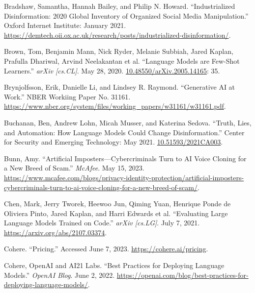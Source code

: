 \documentclass{article}
\begin{document}
\begin{thebibliography}{9}
  Bradshaw, Samantha, Hannah Bailey, and Philip N. Howard. ``Industrialized Disinformation: 2020 Global Inventory of Organized Social Media Manipulation.'' Oxford Internet Institute: January 2021. \href{https://demtech.oii.ox.ac.uk/research/posts/industrialized-disinformation/}{https://demtech.oii.ox.ac.uk/research/posts/industrialized-disinformation/}. 

  Brown, Tom, Benjamin Mann, Nick Ryder, Melanie Subbiah, Jared Kaplan, Prafulla Dhariwal, Arvind Neelakantan et al. ``Language Models are Few-Shot Learners.'' \textit{arXiv [cs.CL]}. May 28, 2020. \href{https://arxiv.org/abs/2005.14165}{10.48550/arXiv.2005.14165}: 35.

  Brynjolfsson, Erik, Danielle Li, and Lindsey R. Raymond. ``Generative AI at Work.'' NBER Workiing Paper No. 31161. \href{https://www.nber.org/system/files/working_papers/w31161/w31161.pdf}{https://www.nber.org/system/files/working\_papers/w31161/w31161.pdf}.

  Buchanan, Ben, Andrew Lohn, Micah Musser, and Katerina Sedova. ``Truth, Lies, and Automation: How Language Models Could Change Disinformation.'' Center for Security and Emerging Technology: May 2021. \href{https://cset.georgetown.edu/publication/truth-lies-and-automation/}{10.51593/2021CA003}.

  Bunn, Amy. ``Artificial Imposters—Cybercriminals Turn to AI Voice Cloning for a New Breed of Scam.'' \textit{McAfee}. May 15, 2023. \href{https://www.mcafee.com/blogs/privacy-identity-protection/artificial-imposters-cybercriminals-turn-to-ai-voice-cloning-for-a-new-breed-of-scam/}{https://www.mcafee.com/blogs/privacy-identity-protection/artificial-imposters-cybercriminals-turn-to-ai-voice-cloning-for-a-new-breed-of-scam/}. 

  Chen, Mark, Jerry Tworek, Heewoo Jun, Qiming Yuan, Henrique Ponde de Oliviera Pinto, Jared Kaplan, and Harri Edwards et al. ``Evaluating Large Language Models Trained on Code.'' \textit{arXiv [cs.LG]}. July 7, 2021. \href{https://arxiv.org/abs/2107.03374}{https://arxiv.org/abs/2107.03374}.

  Cohere. ``Pricing.'' Accessed June 7, 2023. \href{https://cohere.ai/pricing}{https://cohere.ai/pricing}.

  Cohere, OpenAI and AI21 Labs. ``Best Practices for Deploying Language Models.'' \textit{OpenAI Blog}. June 2, 2022. \href{https://openai.com/blog/best-practices-for-deploying-language-models/}{https://openai.com/blog/best-practices-for-deploying-language-models/}.


\end{thebibliography}
\end{document}
